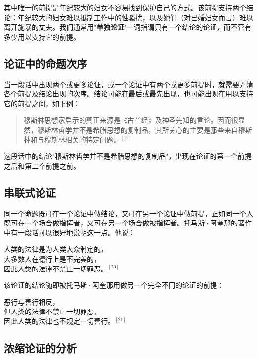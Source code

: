 其中唯一的前提是年纪较大的妇女不容易找到保护自己的方式。该前提支持两个结论：年纪较大的妇女难以抵制工作中的性骚扰，以及她们（对已婚妇女而言）难以离开施暴的丈夫。我们通常用"\textbf{单独论证}"一词指谓只有一个结论的论证，而不管有多少用以支持它的前提。

\subsection{论证中的命题次序}

当一段话中出现两个或更多论证，或一个论证中有两个或更多前提时，就需要弄清各个前提及结论出现的次序。结论可能在最后或最先出现，也可能出现在用以支持它的前提之间，如下例：

\begin{quotation}
穆斯林思想家启示的真正来源是《古兰经》及神圣先知的言论。因而很显然，穆斯林哲学并不是希腊思想的复制品，其所关心的主要是那些来自穆斯林和与穆斯林相关的特定问题。${}^{[19]}$
\end{quotation}

这段话中的结论"穆斯林哲学并不是希腊思想的复制品"，出现在论证的第一个前提之后和第二个前提之前。

\subsection{串联式论证}

同一个命题既可在一个论证中做结论，又可在另一个论证中做前提，正如同一个人既可在一个场合做指挥者，又可在另一个场合做被指挥者。托马斯·阿奎那的著作中有一段话可以很好地说明这一点。他说：

\begin{displayquote}
人类的法律是为人类大众制定的，\\
大多数人在德行上是不完美的，\\
因此人类的法律不禁止一切罪恶。${}^{[20]}$
\end{displayquote}

该论证的结论随即被托马斯·阿奎那用做另一个完全不同的论证的前提：

\begin{displayquote}
恶行与善行相反，\\
但人类的法律不禁止一切罪恶，\\
因此人类的法律也不规定一切善行。${}^{[21]}$
\end{displayquote}

\subsection{浓缩论证的分析}

